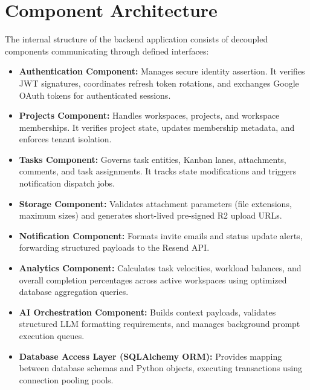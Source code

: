 \section{Component Architecture}
The internal structure of the backend application consists of decoupled components communicating through defined interfaces:
\begin{itemize}
    \item \textbf{Authentication Component:} Manages secure identity assertion. It verifies JWT signatures, coordinates refresh token rotations, and exchanges Google OAuth tokens for authenticated sessions.
    \item \textbf{Projects Component:} Handles workspaces, projects, and workspace memberships. It verifies project state, updates membership metadata, and enforces tenant isolation.
    \item \textbf{Tasks Component:} Governs task entities, Kanban lanes, attachments, comments, and task assignments. It tracks state modifications and triggers notification dispatch jobs.
    \item \textbf{Storage Component:} Validates attachment parameters (file extensions, maximum sizes) and generates short-lived pre-signed R2 upload URLs.
    \item \textbf{Notification Component:} Formats invite emails and status update alerts, forwarding structured payloads to the Resend API.
    \item \textbf{Analytics Component:} Calculates task velocities, workload balances, and overall completion percentages across active workspaces using optimized database aggregation queries.
    \item \textbf{AI Orchestration Component:} Builds context payloads, validates structured LLM formatting requirements, and manages background prompt execution queues.
    \item \textbf{Database Access Layer (SQLAlchemy ORM):} Provides mapping between database schemas and Python objects, executing transactions using connection pooling pools.
\end{itemize}

